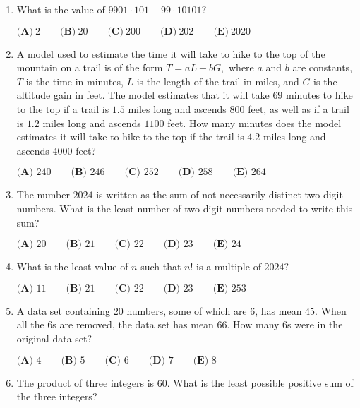 \documentclass{article}
\begin{document}
\begin{enumerate}[label=\arabic*., itemsep=0.5em]\item What is the value of \(9901\cdot101-99\cdot10101?\)

\(\textbf{(A)}~2\qquad\textbf{(B)}~20\qquad\textbf{(C)}~200\qquad\textbf{(D)}~202\qquad\textbf{(E)}~2020\)\par \vspace{0.5em}\item A model used to estimate the time it will take to hike to the top of the mountain on a trail is of the form \(T=aL+bG,\) where \(a\) and \(b\) are constants, \(T\) is the time in minutes, \(L\) is the length of the trail in miles, and \(G\) is the altitude gain in feet. The model estimates that it will take \(69\) minutes to hike to the top if a trail is \(1.5\) miles long and ascends \(800\) feet, as well as if a trail is \(1.2\) miles long and ascends \(1100\) feet. How many minutes does the model estimates it will take to hike to the top if the trail is \(4.2\) miles long and ascends \(4000\) feet?

\(\textbf{(A) }240\qquad\textbf{(B) }246\qquad\textbf{(C) }252\qquad\textbf{(D) }258\qquad\textbf{(E) }264\)\par \vspace{0.5em}\item The number \(2024\) is written as the sum of not necessarily distinct two-digit numbers. What is the least number of two-digit numbers needed to write this sum?

\(\textbf{(A) }20\qquad\textbf{(B) }21\qquad\textbf{(C) }22\qquad\textbf{(D) }23\qquad\textbf{(E) }24\)\par \vspace{0.5em}\item What is the least value of \(n\) such that \(n!\) is a multiple of \(2024\)?

\(
\textbf{(A) }11 \qquad
\textbf{(B) }21 \qquad
\textbf{(C) }22 \qquad
\textbf{(D) }23 \qquad
\textbf{(E) }253 \qquad
\)\par \vspace{0.5em}\item A data set containing \(20\) numbers, some of which are \(6\), has mean \(45\). When all the 6s are removed, the data set has mean \(66\). How many 6s were in the original data set?

\(\textbf{(A) }4\qquad\textbf{(B) }5\qquad\textbf{(C) }6\qquad\textbf{(D) }7\qquad\textbf{(E) }8\)\par \vspace{0.5em}\item The product of three integers is \(60\). What is the least possible positive sum of the three integers?


\end{enumerate}
\end{document}
